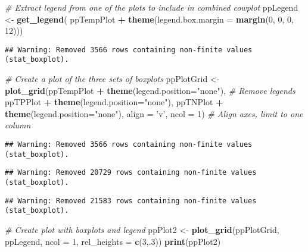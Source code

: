 \documentclass[
]{article}
\newenvironment{Shaded}{\begin{snugshade}}{\end{snugshade}}
\newcommand{\CommentTok}[1]{\textcolor[rgb]{0.56,0.35,0.01}{\textit{#1}}}
\newcommand{\DataTypeTok}[1]{\textcolor[rgb]{0.13,0.29,0.53}{#1}}
\newcommand{\DecValTok}[1]{\textcolor[rgb]{0.00,0.00,0.81}{#1}}
\newcommand{\KeywordTok}[1]{\textcolor[rgb]{0.13,0.29,0.53}{\textbf{#1}}}
\newcommand{\NormalTok}[1]{#1}
\newcommand{\OperatorTok}[1]{\textcolor[rgb]{0.81,0.36,0.00}{\textbf{#1}}}
\newcommand{\StringTok}[1]{\textcolor[rgb]{0.31,0.60,0.02}{#1}}
\begin{document}
\begin{Shaded}
\begin{Highlighting}[]
\CommentTok{# Extract legend from one of the plots to include in combined cowplot}
\NormalTok{ppLegend <-}\StringTok{ }\KeywordTok{get_legend}\NormalTok{(}
\NormalTok{    ppTempPlot }\OperatorTok{+}\StringTok{ }\KeywordTok{theme}\NormalTok{(}\DataTypeTok{legend.box.margin =} \KeywordTok{margin}\NormalTok{(}\DecValTok{0}\NormalTok{, }\DecValTok{0}\NormalTok{, }\DecValTok{0}\NormalTok{, }\DecValTok{12}\NormalTok{)))}
\end{Highlighting}
\end{Shaded}

\begin{verbatim}
## Warning: Removed 3566 rows containing non-finite values (stat_boxplot).
\end{verbatim}

\begin{Shaded}
\begin{Highlighting}[]
\CommentTok{# Create a plot of the three sets of boxplots}
\NormalTok{ppPlotGrid <-}\StringTok{ }\KeywordTok{plot_grid}\NormalTok{(ppTempPlot }\OperatorTok{+}\StringTok{ }\KeywordTok{theme}\NormalTok{(}\DataTypeTok{legend.position=}\StringTok{"none"}\NormalTok{), }\CommentTok{# Remove legends}
\NormalTok{                        ppTPPlot }\OperatorTok{+}\StringTok{ }\KeywordTok{theme}\NormalTok{(}\DataTypeTok{legend.position=}\StringTok{"none"}\NormalTok{),}
\NormalTok{                        ppTNPlot }\OperatorTok{+}\StringTok{ }\KeywordTok{theme}\NormalTok{(}\DataTypeTok{legend.position=}\StringTok{"none"}\NormalTok{),}
                        \DataTypeTok{align =} \StringTok{'v'}\NormalTok{, }\DataTypeTok{ncol =} \DecValTok{1}\NormalTok{) }\CommentTok{# Align axes, limit to one column}
\end{Highlighting}
\end{Shaded}

\begin{verbatim}
## Warning: Removed 3566 rows containing non-finite values (stat_boxplot).
\end{verbatim}

\begin{verbatim}
## Warning: Removed 20729 rows containing non-finite values (stat_boxplot).
\end{verbatim}

\begin{verbatim}
## Warning: Removed 21583 rows containing non-finite values (stat_boxplot).
\end{verbatim}

\begin{Shaded}
\begin{Highlighting}[]
\CommentTok{# Create plot with boxplots and legend}
\NormalTok{ppPlot2 <-}\StringTok{ }\KeywordTok{plot_grid}\NormalTok{(ppPlotGrid, ppLegend, }\DataTypeTok{ncol =} \DecValTok{1}\NormalTok{, }\DataTypeTok{rel_heights =} \KeywordTok{c}\NormalTok{(}\DecValTok{3}\NormalTok{,.}\DecValTok{3}\NormalTok{))}
\KeywordTok{print}\NormalTok{(ppPlot2)}
\end{Highlighting}
\end{Shaded}
\end{document}
